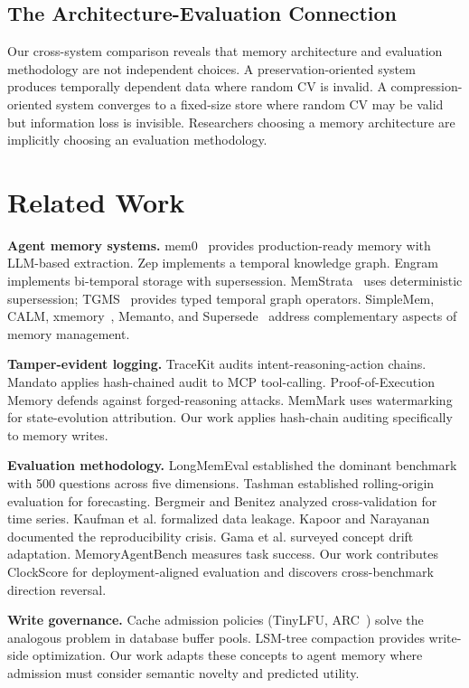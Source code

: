 \documentclass{llncs}
\begin{document}
\subsection{The Architecture-Evaluation Connection}
Our cross-system comparison reveals that memory architecture and evaluation methodology are not independent choices. A preservation-oriented system produces temporally dependent data where random CV is invalid. A compression-oriented system converges to a fixed-size store where random CV may be valid but information loss is invisible. Researchers choosing a memory architecture are implicitly choosing an evaluation methodology.


\section{Related Work}


\textbf{Agent memory systems.} mem0~\cite{mem0} provides production-ready memory with LLM-based extraction. Zep implements a temporal knowledge graph. Engram~\cite{engram} implements bi-temporal storage with supersession. MemStrata~\cite{memstrata} uses deterministic supersession; TGMS~\cite{tgms} provides typed temporal graph operators. SimpleMem, CALM, xmemory~\cite{xmemory}, Memanto, and Supersede~\cite{supersede} address complementary aspects of memory management.

\textbf{Tamper-evident logging.} TraceKit audits intent-reasoning-action chains. Mandato applies hash-chained audit to MCP tool-calling. Proof-of-Execution Memory defends against forged-reasoning attacks. MemMark uses watermarking for state-evolution attribution. Our work applies hash-chain auditing specifically to memory writes.

\textbf{Evaluation methodology.} LongMemEval established the dominant benchmark with 500 questions across five dimensions. Tashman established rolling-origin evaluation for forecasting. Bergmeir and Benitez analyzed cross-validation for time series. Kaufman et al. formalized data leakage. Kapoor and Narayanan documented the reproducibility crisis. Gama et al. surveyed concept drift adaptation. MemoryAgentBench measures task success. Our work contributes ClockScore for deployment-aligned evaluation and discovers cross-benchmark direction reversal.

\textbf{Write governance.} Cache admission policies (TinyLFU, ARC~\cite{arc}) solve the analogous problem in database buffer pools. LSM-tree compaction provides write-side optimization. Our work adapts these concepts to agent memory where admission must consider semantic novelty and predicted utility.
\end{document}
